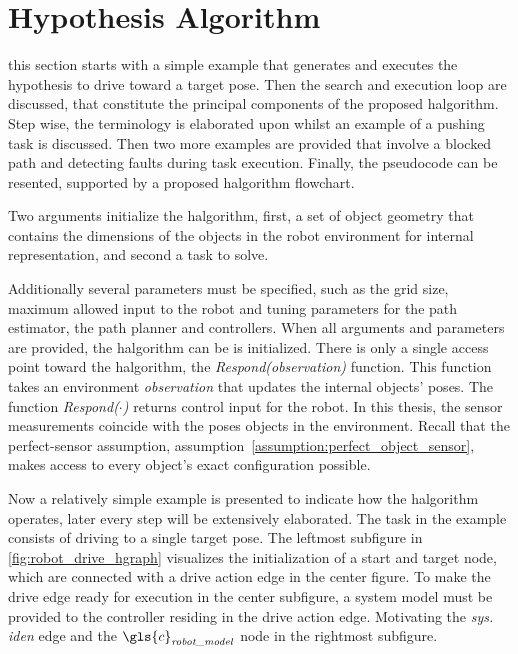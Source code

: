 \section{Hypothesis Algorithm}%
\label{sec:halgorithm}
this section starts with a simple example that generates and executes the hypothesis to drive toward a target pose. Then the search and execution loop are discussed, that constitute the principal components of the proposed \ac{halgorithm}. Step wise, the terminology is elaborated upon whilst an example of a pushing task is discussed. Then two more examples are provided that involve a blocked path and detecting faults during task execution. Finally, the pseudocode can be resented, supported by a proposed \ac{halgorithm} flowchart.\bs

Two arguments initialize the \ac{halgorithm}, first, a set of object geometry that contains the dimensions of the objects in the robot environment for internal representation, and second a task to solve.\bs

Additionally several parameters must be specified, such as the grid size, maximum allowed input to the robot and tuning parameters for the path estimator, the path planner and controllers. When all arguments and parameters are provided, the \ac{halgorithm} can be is initialized. There is only a single access point toward the \ac{halgorithm}, the \textit{Respond(observation)} function. This function takes an environment \textit{observation} that updates the internal objects' poses. The function \textit{Respond($\cdot$)} returns control input for the robot. In this thesis, the sensor measurements coincide with the poses objects in the environment. Recall that the perfect-sensor assumption, assumption~\ref{assumption:perfect_object_sensor}, makes access to every object's exact configuration possible.\bs

Now a relatively simple example is presented to indicate how the \ac{halgorithm} operates, later every step will be extensively elaborated. The task in the example consists of driving to a single target pose. The leftmost subfigure in \cref{fig:robot_drive_hgraph} visualizes the initialization of a start and target node, which are connected with a drive action edge in the center figure. To make the drive edge ready for execution in the center subfigure, a system model must be provided to the controller residing in the drive action edge. Motivating the \textit{sys. iden} edge and the $\gls{c}_\textit{robot\_model}$ node in the rightmost subfigure.\bs

